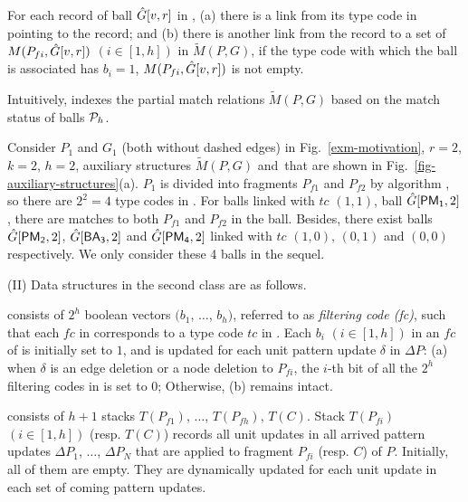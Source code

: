 For each record of ball $\hat{G}{[v,r]}$ in \bs, (a) there is a link from its type code in \fs pointing to the record; and
(b) there is another link from the record to a set of $M({P}_{fi}, \hat{G}{[v,r]})$ $(i\in [1,h])$ in $\tilde{M}(P,G)$,
if the type code with which the ball is associated has $b_i = 1$, \ie $M({P}_{fi}, \hat{G}{[v,r]})$ is not empty.

Intuitively, \fb indexes the partial match relations $\tilde{M}(P,G)$ based on the match status of balls \wrt ${\cal P}_h$.




\begin{example}
\label{exa-matchindex}
Consider $P_1$ and $G_1$ (both without dashed edges) in Fig.~\ref{exm-motivation}, $r=2$, $k=2$, $h=2$,
auxiliary structures $\tilde{M}(P,G)$ and \fb\,that are shown in Fig.~\ref{fig-auxiliary-structures}(a).
$P_1$ is divided into fragments $P_{f1}$ and $P_{f2}$ by algorithm ,
so there are $2^2=4$ type codes in \fs.
For balls linked with $tc$ $(1, 1)$, \eg ball $\hat{G}{[{\mathsf{PM_1}},2]}$,
there are matches to both $P_{f1}$ and $P_{f2}$ in the ball.
Besides, there exist balls $\hat{G}{[{\mathsf{PM_2}},2]}$, $\hat{G}{[{\mathsf{BA_3}},2]}$ and $\hat{G}{[{\mathsf{PM_4}},2]}$
linked with $tc$ $(1, 0)$, $(0, 1)$ and $(0, 0)$ respectively.
We only consider these 4 balls in the sequel.
\end{example}


\vspace{0.5ex}
(II) Data structures in the second class are as follows.

\vspace{0.5ex}
 consists of $2^{h}$ boolean vectors $(b_1$, $\ldots$, $b_h)$, referred to as {\em filtering code (fc)},
such that each $fc$ in \bfc corresponds to a type code $tc$ in \fs.
Each $b_i$ $(i\in [1, h])$ in an $fc$ of \bfc is initially set to $1$,
and is updated for each unit pattern update $\delta$ in $\Delta P$:
(a) when $\delta$ is an edge deletion or a node deletion to ${P}_{fi}$,
the $i$-th bit of all the $2^{h}$ filtering codes in \bfc is set to $0$; Otherwise, (b) \bfc remains intact.


\vspace{0.5ex}
 consists of $h+1$ stacks $T({P}_{f1})$, $\ldots$, $T({P}_{fh})$, $T(C)$.
Stack $T(P_{fi})$ $(i\in [1,h])$ (resp. $T(C)$) records all unit updates in all arrived pattern updates $\Delta P_1$, $\ldots$, $\Delta P_{N}$ that are applied to fragment $P_{fi}$ (resp. $C$) of $P$.
Initially, all of them are empty.
They are dynamically updated for each unit update in each set of coming pattern updates.

